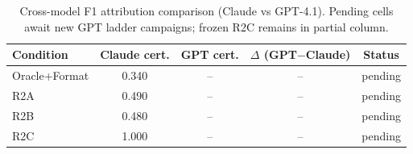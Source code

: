 \begin{table}[t]
  \centering
  \caption{Cross-model F1 attribution comparison (Claude vs GPT-4.1). Pending cells await new GPT ladder campaigns; frozen R2C remains in partial column.}
  \label{tab:extension-cross-model-attribution}
  \footnotesize
  \begin{tabular}{@{}lcccc@{}}
    \toprule
    Condition & Claude cert. & GPT cert. & $\Delta$ (GPT$-$Claude) & Status \\
    \midrule
    Oracle+Format & 0.340 & -- & -- & pending \\
    R2A & 0.490 & -- & -- & pending \\
    R2B & 0.480 & -- & -- & pending \\
    R2C & 1.000 & -- & -- & pending \\
    \bottomrule
  \end{tabular}
\end{table}
